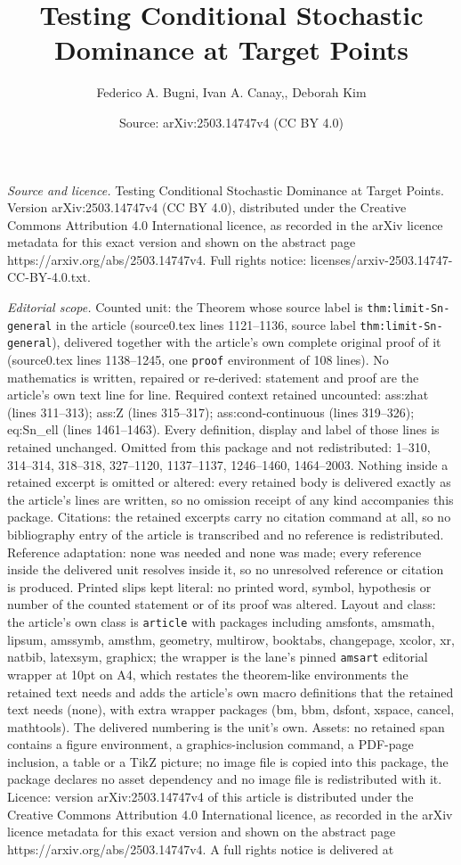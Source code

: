 \documentclass[10pt,a4paper]{amsart}
\title[Testing Conditional Stochastic Dominance at Target Points]{Testing Conditional Stochastic Dominance at Target Points}
\author{Federico A. Bugni, Ivan A. Canay,, Deborah Kim}
\date{Source: arXiv:2503.14747v4 (CC BY 4.0)}
\begin{document}
\maketitle

\noindent\emph{Source and licence.} Testing Conditional Stochastic Dominance at Target Points. Version arXiv:2503.14747v4 (CC BY 4.0), distributed under the Creative Commons Attribution 4.0 International licence, as recorded in the arXiv licence metadata for this exact version and shown on the abstract page https://arxiv.org/abs/2503.14747v4. Full rights notice: licenses/arxiv-2503.14747-CC-BY-4.0.txt.\par\smallskip

\noindent\textit{Editorial scope.} Counted unit: the Theorem whose source label is \texttt{thm:limit-Sn-general} in the article (source0.tex lines 1121--1136, source label \texttt{thm:limit-Sn-general}), delivered together with the article's own complete original proof of it (source0.tex lines 1138--1245, one \texttt{proof} environment of 108 lines). No mathematics is written, repaired or re-derived: statement and proof are the article's own text line for line. Required context retained uncounted: ass:zhat (lines 311--313); ass:Z (lines 315--317); ass:cond-continuous (lines 319--326); eq:Sn\_ell (lines 1461--1463). Every definition, display and label of those lines is retained unchanged. Omitted from this package and not redistributed: 1--310, 314--314, 318--318, 327--1120, 1137--1137, 1246--1460, 1464--2003. Nothing inside a retained excerpt is omitted or altered: every retained body is delivered exactly as the article's lines are written, so no omission receipt of any kind accompanies this package. Citations: the retained excerpts carry no citation command at all, so no bibliography entry of the article is transcribed and no reference is redistributed. Reference adaptation: none was needed and none was made; every reference inside the delivered unit resolves inside it, so no unresolved reference or citation is produced. Printed slips kept literal: no printed word, symbol, hypothesis or number of the counted statement or of its proof was altered. Layout and class: the article's own class is \texttt{article} with packages including amsfonts, amsmath, lipsum, amssymb, amsthm, geometry, multirow, booktabs, changepage, xcolor, xr, natbib, latexsym, graphicx; the wrapper is the lane's pinned \texttt{amsart} editorial wrapper at 10pt on A4, which restates the theorem-like environments the retained text needs and adds the article's own macro definitions that the retained text needs (none), with extra wrapper packages (bm, bbm, dsfont, xspace, cancel, mathtools). The delivered numbering is the unit's own. Assets: no retained span contains a figure environment, a graphics-inclusion command, a PDF-page inclusion, a table or a TikZ picture; no image file is copied into this package, the package declares no asset dependency and no image file is redistributed with it. Licence: version arXiv:2503.14747v4 of this article is distributed under the Creative Commons Attribution 4.0 International licence, as recorded in the arXiv licence metadata for this exact version and shown on the abstract page https://arxiv.org/abs/2503.14747v4. A full rights notice is delivered at 
\end{document}
